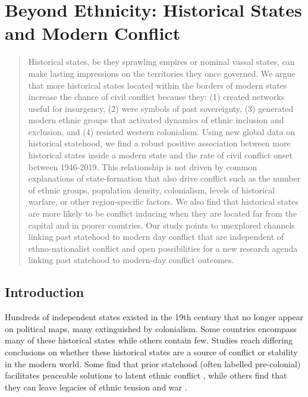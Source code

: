 
\chapter{Beyond Ethnicity: Historical States and Modern Conflict}


\begin{abstract} 

	Historical states, be they sprawling empires or nominal vassal
	states, can make lasting impressions on the territories they once
	governed. We argue that more historical states located within the
	borders of modern states increase the chance of civil conflict because
	they: (1) created networks useful for insurgency, (2) were symbols of
	past sovereignty, (3) generated modern ethnic groups that activated
	dynamics of ethnic inclusion and exclusion, and (4) resisted western
	colonialism. Using new global data on historical statehood, we find a
	robust positive association between more historical states inside a
	modern state and the rate of civil conflict onset between 1946-2019.
	This relationship is not driven by common explanations of
	state-formation that also drive conflict such as the number of ethnic
	groups, population density, colonialism, levels of historical warfare,
	or other region-specific factors. We also find that historical states
	are more likely to be conflict inducing when they are located far from
	the capital and in poorer countries. Our study points to unexplored
	channels linking past statehood to modern day conflict that are
	independent of ethno-nationalist conflict and open possibilities for a
	new research agenda linking past statehood to modern-day conflict
	outcomes.

\end{abstract}

\bigskip {}

\pagebreak


\section{Introduction}

Hundreds of independent states existed in the 19th century that no longer appear on political maps, many extinguished by colonialism. Some
countries encompass many of these historical states while others contain few.
Studies reach differing conclusions on whether these historical states are a
source of conflict or stability in the modern world. Some find that prior
statehood (often labelled pre-colonial) facilitates peaceable solutions to
latent ethnic conflict \citep{Depetris-Chauvin2016, Wig2016}, while others find
that they can leave legacies of ethnic tension and war \citep{Besley2014,
Paine2019, Englebert2000, Alesina2003}. 

